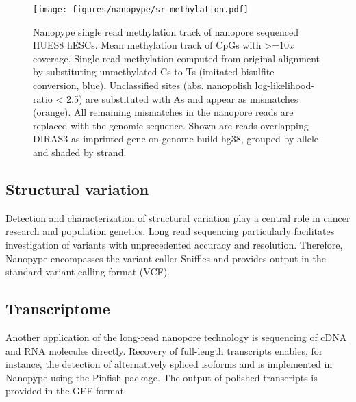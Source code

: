 \begin{figure}[h]
	\centering
	\texttt{[image: figures/nanopype/sr\_methylation.pdf]}
	\captionsetup{format=plain}
	\caption[Nanopype single read methylation track]{Nanopype single read methylation track of nanopore sequenced HUES8 hESCs. Mean methylation track of CpGs with >=10\textit{x} coverage. Single read methylation computed from original alignment by substituting unmethylated Cs to Ts (imitated bisulfite conversion, blue). Unclassified sites (abs. nanopolish log-likelihood-ratio < 2.5) are substituted with As and appear as mismatches (orange). All remaining mismatches in the nanopore reads are replaced with the genomic sequence. Shown are reads overlapping DIRAS3 as imprinted gene on genome build hg38, grouped by allele and shaded by strand.}
	\label{fig:nanopype:sr_methylation}
\end{figure}


\subsection{Structural variation}
\label{subsec:nanopype:sv}
Detection and characterization of structural variation play a central role in cancer research and population genetics. Long read sequencing particularly facilitates investigation of variants with unprecedented accuracy and resolution. Therefore, Nanopype encompasses the variant caller Sniffles \cite{Sedlazeck2018} and provides output in the standard variant calling format (VCF).


\subsection{Transcriptome}
\label{subsec:nanopype:transcriptom}
Another application of the long-read nanopore technology is sequencing of cDNA and RNA molecules directly. Recovery of full-length transcripts enables, for instance, the detection of alternatively spliced isoforms and is implemented in Nanopype using the Pinfish package. The output of polished transcripts is provided in the GFF format.

